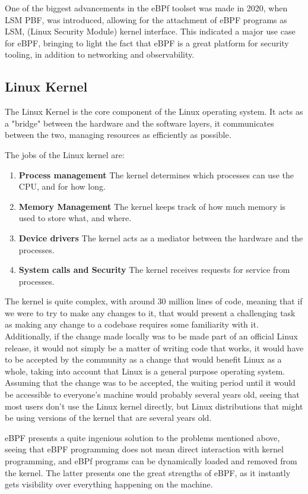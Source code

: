 One of the biggest advancements in the eBPf toolset was made in 2020, when LSM PBF, was introduced, allowing for the attachment of eBPF programs as LSM, (Linux Security Module) kernel interface. This indicated a major use case for eBPF, bringing to light the fact that eBPF is a great platform for security tooling, in addition to networking and observability.

\subsection{Linux Kernel}
The Linux Kernel is the core component of the Linux operating system. It acts as a "bridge" between the hardware and the software layers, it communicates between the two, managing resources as efficiently as possible. 

The jobs of the Linux kernel are:
\begin{enumerate}
    \item \textbf{Process management}
        The kernel determines which processes can use the CPU, and for how long.
    \item \textbf{Memory Management}
        The kernel keeps track of how much memory is used to store what, and where.
    \item \textbf{Device drivers}
        The kernel acts as a mediator between the hardware and the processes.
    \item \textbf{System calls and Security}
        The kernel receives requests for service from processes.
\end{enumerate}


The kernel is quite complex, with around 30 million lines of code, meaning that if we were to try to make any changes to it, that would present a challenging task as making any change to a codebase requires some familiarity with it. Additionally, if the change made locally was to be made part of an official Linux release, it would not simply be a matter of writing code that works, it would have to be accepted by the community as a change that would benefit Linux as a whole, taking into account that Linux is a general purpose operating system. Assuming that the change was to be accepted, the waiting period until it would be accessible to everyone's machine would probably several years old, seeing that most users don't use the Linux kernel directly, but Linux distributions that might be using versions of the kernel that are several years old.

eBPF presents a quite ingenious solution to the problems mentioned above, seeing that eBPF programming does not mean direct interaction with kernel programming, and eBPf programs can be dynamically loaded and removed from the kernel. The latter presents one the great strengths of eBPF, as it instantly gets visibility over everything happening on the machine.


